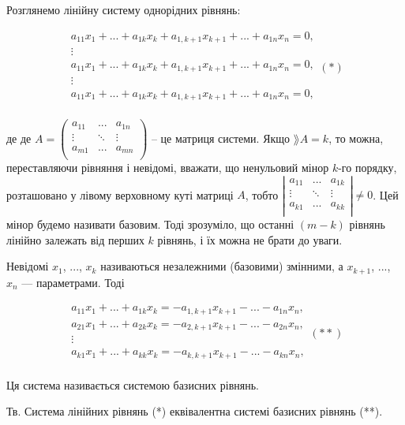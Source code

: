 Розглянемо лінійну систему однорідних рівнянь:

$$\begin{matrix}
	a_{11} x_1 + ... + a_{1k} x_k + a_{1,k+1} x_{k+1} + ... + a_{1n} x_n = 0, \\
	\vdots \\
	a_{11} x_1 + ... + a_{1k} x_k + a_{1,k+1} x_{k+1} + ... + a_{1n} x_n = 0, \\
	\vdots \\
	a_{11} x_1 + ... + a_{1k} x_k + a_{1,k+1} x_{k+1} + ... + a_{1n} x_n = 0, \\
\end{matrix} (*)$$

де де $A = \begin{pmatrix}
	a_{11} & ...    & a_{1n} \\
	\vdots & \ddots & \vdots \\
	a_{m1} & ...    & a_{mn} \\
\end{pmatrix}$ -- це матриця системи. Якщо $\rang A = k$, то можна,
переставляючи рівняння і невідомі, вважати, що ненульовий мінор $k$-го порядку,
розташовано у лівому верховному куті матриці $A$, тобто $\left| \begin{matrix}
	a_{11} & ...    & a_{1k} \\
	\vdots & \ddots & \vdots \\
	a_{k1} & ...    & a_{kk} \\
\end{matrix} \right| \neq 0$. Цей
мінор будемо називати базовим. Тоді зрозуміло, що останні $(m - k)$ рівнянь лінійно
залежать від перших $k$ рівнянь, і їх можна не брати до уваги.


Невідомі $x_1$, ..., $x_k$ називаються незалежними (базовими) змінними, а $x_{k+1}$, ..., $x_n$ ---
параметрами. Тоді

$$\begin{matrix}
	a_{11} x_1 + ... + a_{1k} x_k = -a_{1,k+1} x_{k+1} - ... - a_{1n} x_n, \\
	a_{21} x_1 + ... + a_{2k} x_k = -a_{2,k+1} x_{k+1} - ... - a_{2n} x_n, \\
	\vdots \\
	a_{k1} x_1 + ... + a_{kk} x_k = -a_{k,k+1} x_{k+1} - ... - a_{kn} x_n, \\
\end{matrix} (**)$$


Ця система називається системою базисних рівнянь.


Тв. Система лінійних рівнянь (*) еквівалентна системі базисних рівнянь (**).



